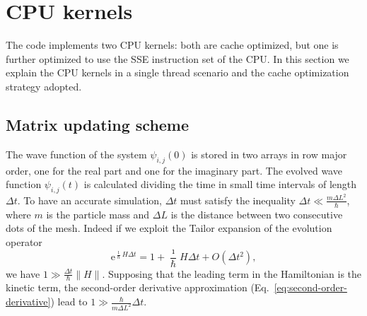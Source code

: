 
\section{CPU kernels}
The code implements two CPU kernels: both are  cache optimized, but one is further optimized to use the SSE instruction set of the CPU. In this section we explain the CPU kernels in a single thread scenario and the cache optimization strategy adopted.

\subsection{Matrix updating scheme}
The wave function of the system $\psi_{i,j}(0)$ is stored in two arrays in row major order, one for the real part and one for the imaginary part. The evolved wave function $\psi_{i,j}(t)$ is calculated dividing the time in small time intervals of length $\Delta t$. To have an accurate simulation, $\Delta t$ must satisfy the inequality $\Delta t \ll \frac{m \Delta L^2}{\hbar}$, where $m$ is the particle mass and $\Delta L$ is the distance between two consecutive dots of the mesh. Indeed if we exploit the Tailor expansion of the evolution operator
\begin{equation}
\mathrm{e}^{\frac{\imath}{\hbar}H\Delta t} = 1 + \frac{\imath}{\hbar}H\Delta t + O(\Delta t^2),
\end{equation} 
we have $1 \gg \frac{\Delta t}{\hbar}\parallel H \parallel $. Supposing that the leading term in the Hamiltonian is the kinetic term, the second-order derivative approximation (Eq.~\eqref{eq:second-order-derivative}) lead to $1 \gg \frac{\hbar}{m \Delta L^2} \Delta t$.

